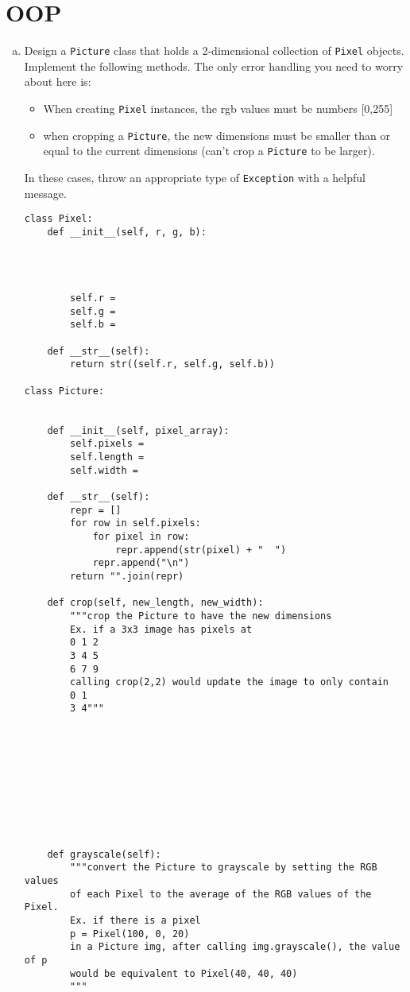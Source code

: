 \documentclass[11pt]{article}
\begin{document}
\section{OOP}
\begin{enumerate}[a)]
\item Design a \texttt{Picture} class that holds a 2-dimensional collection of \texttt{Pixel} objects. Implement the following methods. The only error handling you need to worry about here is:
\begin{itemize}
\item When creating \texttt{Pixel} instances, the rgb values must be numbers [0,255]
\item when cropping a \texttt{Picture}, the new dimensions must be smaller than or equal to the current dimensions (can't crop a \texttt{Picture} to be larger).
\end{itemize}
In these cases, throw an appropriate type of \texttt{Exception} with a helpful message.
\begin{verbatim}
class Pixel:
    def __init__(self, r, g, b):




        self.r = 
        self.g = 
        self.b = 

    def __str__(self):
        return str((self.r, self.g, self.b))

class Picture:


    def __init__(self, pixel_array):
        self.pixels = 
        self.length = 
        self.width = 

    def __str__(self):
        repr = []
        for row in self.pixels:
            for pixel in row:
                repr.append(str(pixel) + "  ")
            repr.append("\n")
        return "".join(repr)

    def crop(self, new_length, new_width):
        """crop the Picture to have the new dimensions
        Ex. if a 3x3 image has pixels at
        0 1 2
        3 4 5
        6 7 9
        calling crop(2,2) would update the image to only contain
        0 1
        3 4"""










    def grayscale(self):
        """convert the Picture to grayscale by setting the RGB values
        of each Pixel to the average of the RGB values of the Pixel.
        Ex. if there is a pixel
        p = Pixel(100, 0, 20)        
        in a Picture img, after calling img.grayscale(), the value of p
        would be equivalent to Pixel(40, 40, 40)
        """











\end{verbatim}
\end{enumerate}
\end{document}
